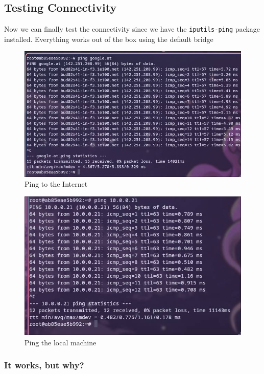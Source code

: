 \documentclass[a4paper]{article}
\begin{document}
\subsection{Testing Connectivity}
Now we can finally test the connectivity since we have the \texttt{iputils-ping} package installed. Everything works out of the box using the default bridge \cite{Docker-bridge}

\begin{figure}[h]
	\centering
	\includegraphics[scale=0.3]{images/ping_internet.png}
	\caption{Ping to the Internet}
\end{figure}
\begin{figure}[h]
	\centering
	\includegraphics[scale=0.3]{images/ping_lokal.png}
	\caption{Ping the local machine}
\end{figure}
\newpage
\subsubsection {It works, but why?}
\end{document}
